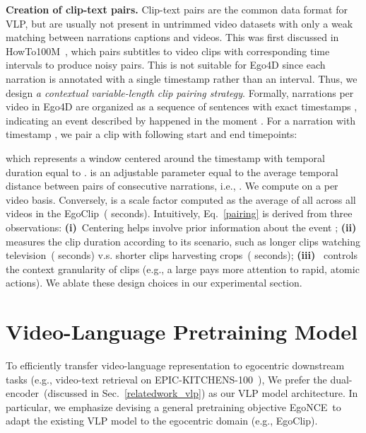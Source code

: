 \documentclass{article}
\newcommand{\dataset}{EgoClip}
\newcommand{\model}{EgoNCE\xspace}
\newcommand{\epic}{EPIC-KITCHENS-100}
\newcommand{\howto}{HowTo100M}
\begin{document}
\textbf{Creation of clip-text pairs.}
Clip-text pairs are the common data format for VLP, but are usually not present in untrimmed video datasets with only a weak matching between narrations captions and videos.
This was first discussed in \howto~\cite{miech2019howto100m}, which pairs subtitles to video clips with corresponding time intervals to produce noisy pairs.
This is not suitable for Ego4D since each narration is annotated with a single timestamp rather than an interval.
Thus, we design \textit{a contextual variable-length clip pairing strategy}.
Formally, narrations per video in Ego4D are organized as a sequence of sentences  with exact timestamps , indicating an event  described by  happened in the moment .
For a narration  with timestamp , we pair a clip  with following start and end timepoints: 

which represents a window centered around the timestamp  with temporal duration equal to .  is an adjustable parameter equal to the average temporal distance between pairs of consecutive narrations, i.e., . We compute  on a per video basis. Conversely,  is a scale factor computed as the average of all  across all videos in  the \dataset~( seconds).
Intuitively, Eq.~\ref{pairing} is derived from three observations:
\textbf{(i)}~Centering  helps involve prior information about the event ;
\textbf{(ii)}~ measures the clip duration according to its scenario, such as longer clips watching television~( seconds) {v.s.} shorter clips harvesting crops~( seconds);
\textbf{(iii)}~ controls the context granularity of clips (e.g.,
a large  pays more attention to rapid, atomic actions).
We ablate these design choices in our experimental section. \section{Video-Language Pretraining Model}
To efficiently transfer video-language representation to egocentric downstream tasks (e.g., video-text retrieval on \epic~\cite{damen2022rescaling}), We prefer the dual-encoder~(discussed in Sec.~\ref{relatedwork_vlp}) as our VLP model architecture.
In particular, we emphasize devising a general pretraining objective \model~to adapt the existing VLP model to the egocentric domain (e.g., \dataset).
\end{document}
